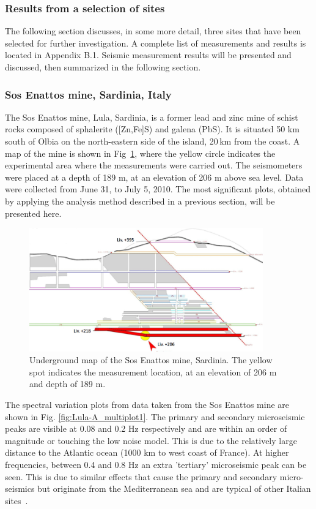 \FloatBarrier
\subsubsection{Results from a selection of sites}
The following section discusses, in some more detail, three sites that have been selected for further investigation. A complete list of measurements and results is located in Appendix B.1. Seismic measurement results will be presented and discussed, then summarized in the following section. 
\FloatBarrier
\subsubsection*{Sos Enattos mine, Sardinia, Italy}
The Sos Enattos mine, Lula, Sardinia, is a former lead and zinc mine of schist rocks composed of sphalerite ([Zn,Fe]S) and galena (PbS). It is situated 50 km south of Olbia on the north-eastern side of the island, 20\,km from the coast. A map of the mine is shown in Fig~\ref{fig:sosenattos}, where the yellow circle indicates the experimental area where the measurements were carried out. The seismometers were placed at a depth of 189 m, at an elevation of 206 m above sea level. Data were collected from June 31, to July 5, 2010. The most significant plots, obtained by applying the analysis method described in a previous section, will be presented here.

\begin{figure}[h]
	\begin{center}
		\includegraphics[width=0.9\textwidth]{./Sec_SiteInfra/Figures/sosenattos2.pdf}
		\caption{Underground map of the Sos Enattos mine, Sardinia. The yellow spot indicates the measurement location, at an elevation of 206 m and depth of 189 m.}
		\label{fig:sosenattos}
	\end{center}
\end{figure}
The spectral variation plots from data taken from the Sos Enattos mine are shown in Fig. \ref{fig:Lula-A_multiplot1}. The primary and secondary microseismic peaks are visible at 0.08 and 0.2 Hz respectively and are within an order of magnitude or touching the low noise model. This is due to the relatively large distance to the Atlantic ocean (1000 km to west coast of France). At higher frequencies, between 0.4 and 0.8 Hz an extra 'tertiary' microseismic peak can be seen. This is due to similar effects that cause the primary and secondary micro-seismics but originate from the Mediterranean sea and are typical of other Italian sites~\cite{marchetti}.


